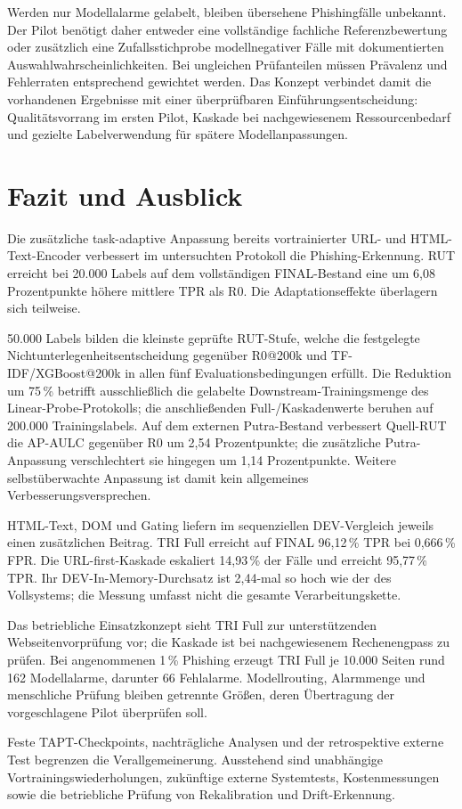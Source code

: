 Werden nur Modellalarme gelabelt, bleiben übersehene Phishingfälle unbekannt. Der Pilot
benötigt daher entweder eine vollständige fachliche Referenzbewertung oder zusätzlich
eine Zufallsstichprobe modellnegativer Fälle mit dokumentierten Auswahlwahrscheinlichkeiten.
Bei ungleichen Prüfanteilen müssen Prävalenz und Fehlerraten entsprechend gewichtet werden.
Das Konzept verbindet damit die vorhandenen Ergebnisse mit einer überprüfbaren
Einführungsentscheidung: Qualitätsvorrang im ersten Pilot, Kaskade bei nachgewiesenem
Ressourcenbedarf und gezielte Labelverwendung für spätere Modellanpassungen.


\clearpage
\section{Fazit und Ausblick}

Die zusätzliche task-adaptive Anpassung bereits vortrainierter URL- und HTML-Text-Encoder
verbessert im untersuchten Protokoll die Phishing-Erkennung. RUT erreicht bei 20.000 Labels
auf dem vollständigen FINAL-Bestand eine um 6,08 Prozentpunkte höhere mittlere TPR als R0.
Die Adaptationseffekte überlagern sich teilweise.

50.000 Labels bilden die kleinste geprüfte RUT-Stufe, welche die festgelegte
Nichtunterlegenheitsentscheidung gegenüber R0@200k und TF-IDF/XGBoost@200k in allen fünf
Evaluationsbedingungen erfüllt. Die Reduktion um 75\,\% betrifft ausschließlich die gelabelte
Downstream-Trainingsmenge des Linear-Probe-Protokolls; die anschließenden
Full-/Kaskadenwerte beruhen auf 200.000 Trainingslabels. Auf dem externen Putra-Bestand verbessert Quell-RUT die AP-AULC
gegenüber R0 um 2,54 Prozentpunkte; die zusätzliche Putra-Anpassung verschlechtert sie
hingegen um 1,14 Prozentpunkte. Weitere selbstüberwachte Anpassung ist damit kein
allgemeines Verbesserungsversprechen.

HTML-Text, DOM und Gating liefern im sequenziellen DEV-Vergleich jeweils einen zusätzlichen
Beitrag. TRI Full erreicht auf FINAL 96,12\,\% TPR bei 0,666\,\% FPR. Die URL-first-Kaskade
eskaliert 14,93\,\% der Fälle und erreicht 95,77\,\% TPR. Ihr DEV-In-Memory-Durchsatz
ist 2,44-mal so hoch wie der des Vollsystems; die Messung umfasst nicht die gesamte Verarbeitungskette.


Das betriebliche Einsatzkonzept sieht TRI Full zur unterstützenden Webseitenvorprüfung
vor; die Kaskade ist bei nachgewiesenem Rechenengpass zu prüfen. Bei angenommenen
1\,\% Phishing erzeugt TRI Full je 10.000 Seiten rund 162 Modellalarme, darunter 66
Fehlalarme. Modellrouting, Alarmmenge und menschliche Prüfung bleiben getrennte Größen,
deren Übertragung der vorgeschlagene Pilot überprüfen soll.

Feste TAPT-Checkpoints, nachträgliche Analysen und der retrospektive externe Test begrenzen
die Verallgemeinerung. Ausstehend sind unabhängige Vortrainingswiederholungen, zukünftige
externe Systemtests, Kostenmessungen sowie die betriebliche Prüfung von Rekalibration
und Drift-Erkennung.
